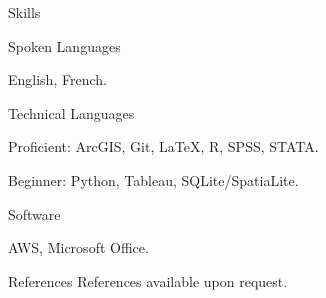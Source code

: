 \documentclass[10pt]{resume} %
\begin{document}
	\begin{rSection}{Skills} \itemsep -5pt
		\begin{rSubsection}{Spoken Languages}{}{}
			\item English, French.
		\end{rSubsection}
		\begin{rSubsection}{Technical Languages}{}{}
			\item Proficient: ArcGIS, Git, \LaTeX, R, SPSS, STATA.
			\item Beginner: Python, Tableau, SQLite/SpatiaLite.
		\end{rSubsection}
		\begin{rSubsection}{Software}{}{}
			\item AWS, Microsoft Office.
		\end{rSubsection}
	\end{rSection}
	
	\begin{rSection}{References}
		References available upon request. 
	\end{rSection}
	
\end{document}
